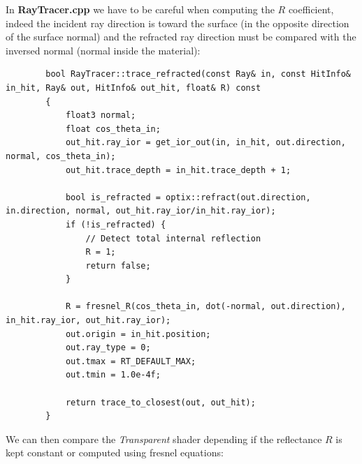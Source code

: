 \documentclass[a4,12pt]{article}
\begin{document}
	In \textbf{RayTracer.cpp} we have to be careful when computing the $R$ coefficient, indeed the incident ray direction is toward the surface (in the opposite direction of the surface normal) and the refracted ray direction must be compared with the inversed normal (normal inside the material):
	\begin{lstlisting}
		bool RayTracer::trace_refracted(const Ray& in, const HitInfo& in_hit, Ray& out, HitInfo& out_hit, float& R) const
		{
			float3 normal;
			float cos_theta_in;
			out_hit.ray_ior = get_ior_out(in, in_hit, out.direction, normal, cos_theta_in);
			out_hit.trace_depth = in_hit.trace_depth + 1;
			
			bool is_refracted = optix::refract(out.direction, in.direction, normal, out_hit.ray_ior/in_hit.ray_ior);
			if (!is_refracted) {
				// Detect total internal reflection
				R = 1;
				return false;
			}
			
			R = fresnel_R(cos_theta_in, dot(-normal, out.direction), in_hit.ray_ior, out_hit.ray_ior);
			out.origin = in_hit.position;
			out.ray_type = 0;
			out.tmax = RT_DEFAULT_MAX;
			out.tmin = 1.0e-4f;
			
			return trace_to_closest(out, out_hit);
		}
	\end{lstlisting}
	
	We can then compare the \textit{Transparent} shader depending if the reflectance $R$ is kept constant or computed using fresnel equations:
	
\end{document}
